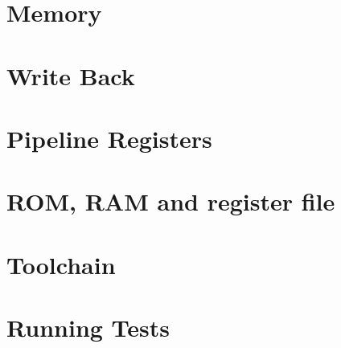 \documentclass[12pt]{article}
\begin{document}
\section{Memory}



\section{Write Back}



\section{Pipeline Registers}


\section{ROM, RAM and register file}




\section{Toolchain}


\section{Running Tests}



\printbibliography
\end{document}
